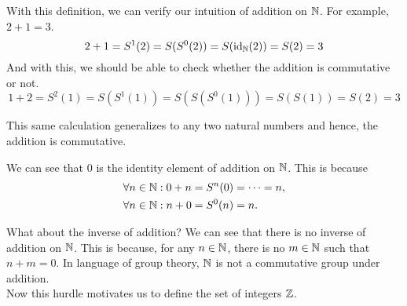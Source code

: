 \begin{example}[2 + 1 = 3]
	With this definition, we can verify our intuition of addition on \(\mathbb N\). For example, \(2 + 1 = 3\).
	\begin{equation*}
		2 + 1 = S^1(2) = S(S^0(2)) = S(\operatorname{id}_\mathbb N(2)) = S(2) = 3
	\end{equation*}
	And with this, we should be able to check whether the addition is commutative or not.
	\begin{equation*}
		1 + 2 = S^2(1) = S(S^1(1)) = S(S(S^0(1))) = S(S(1)) = S(2) = 3
	\end{equation*}
\end{example}
This same calculation generalizes to any two natural numbers and hence, the addition is commutative.
\begin{remark}
	We can see that \(0\) is the identity element of addition on \(\mathbb N\). This is because
	\begin{align*}
		\forall n \in \mathbb N: 0 + n & = S^n(0) = \cdots = n, \\
		\forall n \in \mathbb N: n + 0 & = S^0(n) = n.
	\end{align*}
\end{remark}
What about the inverse of addition? We can see that there is no inverse of addition on \(\mathbb N\). This is because, for any \(n \in \mathbb N\), there is no \(m \in \mathbb N\) such that \(n + m = 0\). In language of group theory, \(\mathbb N\) is not a commutative group under addition.\\
Now this hurdle motivates us to define the set of integers \(\mathbb Z\).

